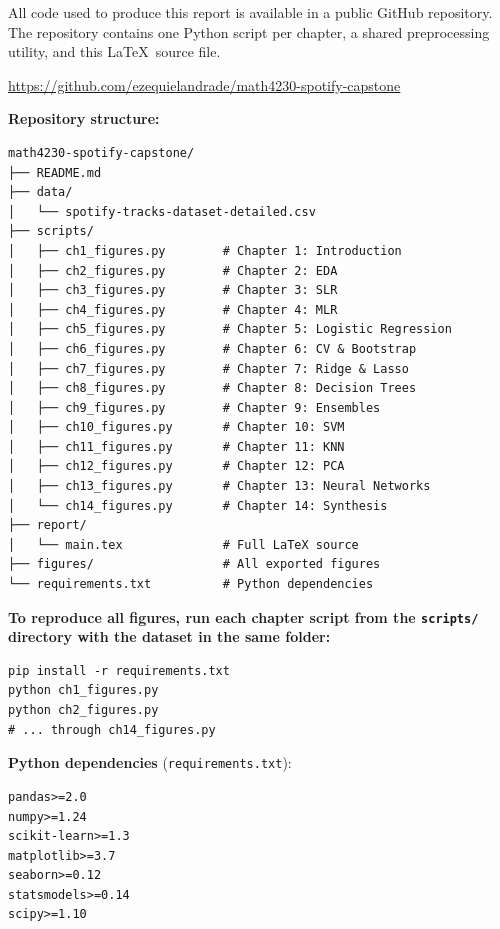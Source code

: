\documentclass[12pt, oneside]{book}
\begin{document}
All code used to produce this report is available in a public GitHub repository. The repository contains one Python script per chapter, a shared preprocessing utility, and this \LaTeX\ source file.
 
\begin{center}
\url{https://github.com/ezequielandrade/math4230-spotify-capstone}
\end{center}
 
\textbf{Repository structure:}
 
\begin{verbatim}
math4230-spotify-capstone/
├── README.md
├── data/
│   └── spotify-tracks-dataset-detailed.csv
├── scripts/
│   ├── ch1_figures.py        # Chapter 1: Introduction
│   ├── ch2_figures.py        # Chapter 2: EDA
│   ├── ch3_figures.py        # Chapter 3: SLR
│   ├── ch4_figures.py        # Chapter 4: MLR
│   ├── ch5_figures.py        # Chapter 5: Logistic Regression
│   ├── ch6_figures.py        # Chapter 6: CV & Bootstrap
│   ├── ch7_figures.py        # Chapter 7: Ridge & Lasso
│   ├── ch8_figures.py        # Chapter 8: Decision Trees
│   ├── ch9_figures.py        # Chapter 9: Ensembles
│   ├── ch10_figures.py       # Chapter 10: SVM
│   ├── ch11_figures.py       # Chapter 11: KNN
│   ├── ch12_figures.py       # Chapter 12: PCA
│   ├── ch13_figures.py       # Chapter 13: Neural Networks
│   └── ch14_figures.py       # Chapter 14: Synthesis
├── report/
│   └── main.tex              # Full LaTeX source
├── figures/                  # All exported figures
└── requirements.txt          # Python dependencies
\end{verbatim}
 
\textbf{To reproduce all figures, run each chapter script from the \texttt{scripts/} directory with the dataset in the same folder:}
 
\begin{verbatim}
pip install -r requirements.txt
python ch1_figures.py
python ch2_figures.py
# ... through ch14_figures.py
\end{verbatim}
 
\textbf{Python dependencies} (\texttt{requirements.txt}):
\begin{verbatim}
pandas>=2.0
numpy>=1.24
scikit-learn>=1.3
matplotlib>=3.7
seaborn>=0.12
statsmodels>=0.14
scipy>=1.10
\end{verbatim}
 
\end{document}
